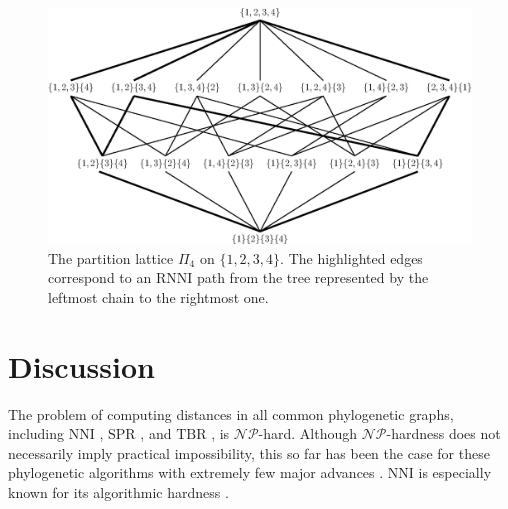 \documentclass{amsart}
\newcommand{\np}{\mathcal{NP}}
\newcommand{\nni}{\mathrm{NNI}}
\newcommand{\rnni}{\mathrm{RNNI}}
\newcommand{\tbr}{\mathrm{TBR}}
\newcommand{\spr}{\mathrm{SPR}}
\begin{document}
\begin{figure}[H]
\centering
\includegraphics[width=\textwidth]{partition_lattice4}
\vspace{12pt}
\caption{The partition lattice $\Pi_4$ on $\{1,2,3,4\}$.
The highlighted edges correspond to an $\rnni$ path from the tree represented by the leftmost chain to the rightmost one.}
\label{fig:partition_lattice4}
\end{figure}


\section{Discussion}

The problem of computing distances in all common phylogenetic graphs, including $\nni$ \autocite{Dasgupta2000-xa}, $\spr$ \autocite{Bordewich2005-nx}, and $\tbr$ \autocite{Allen2001-ky}, is $\np$-hard.
Although $\np$-hardness does not necessarily imply practical impossibility, this so far has been the case for these phylogenetic algorithms with extremely few major advances \autocite{Whidden2010-bw}.
$\nni$ is especially known for its algorithmic hardness \autocite{Whidden2018-fw}.
\end{document}
